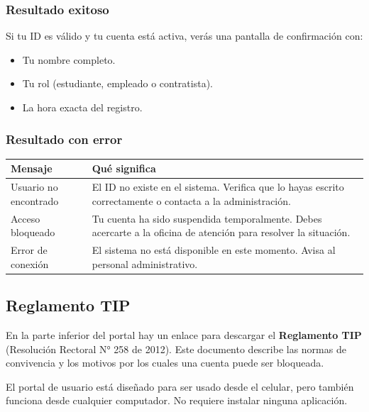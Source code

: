 \documentclass[12pt, a4paper]{article}
\begin{document}
\subsubsection{Resultado exitoso}

Si tu ID es válido y tu cuenta está activa, verás una pantalla de
confirmación con:
\begin{itemize}
  \item Tu nombre completo.
  \item Tu rol (estudiante, empleado o contratista).
  \item La hora exacta del registro.
\end{itemize}

\subsubsection{Resultado con error}

\begin{center}
\renewcommand{\arraystretch}{1.4}
\begin{tabular}{@{} p{4.5cm} p{8.5cm} @{}}
  \toprule
  \textbf{Mensaje} & \textbf{Qué significa} \\
  \midrule
  Usuario no encontrado &
    El ID no existe en el sistema. Verifica que lo hayas escrito
    correctamente o contacta a la administración. \\[0.3em]
  Acceso bloqueado &
    Tu cuenta ha sido suspendida temporalmente. Debes acercarte
    a la oficina de atención para resolver la situación. \\[0.3em]
  Error de conexión &
    El sistema no está disponible en este momento. Avisa al
    personal administrativo. \\
  \bottomrule
\end{tabular}
\end{center}

\subsection{Reglamento TIP}

En la parte inferior del portal hay un enlace para descargar el
\textbf{Reglamento TIP} (Resolución Rectoral N° 258 de 2012). Este
documento describe las normas de convivencia y los motivos por los
cuales una cuenta puede ser bloqueada.

\begin{aviso}
  El portal de usuario está diseñado para ser usado desde el celular,
  pero también funciona desde cualquier computador. No requiere
  instalar ninguna aplicación.
\end{aviso}
\end{document}
